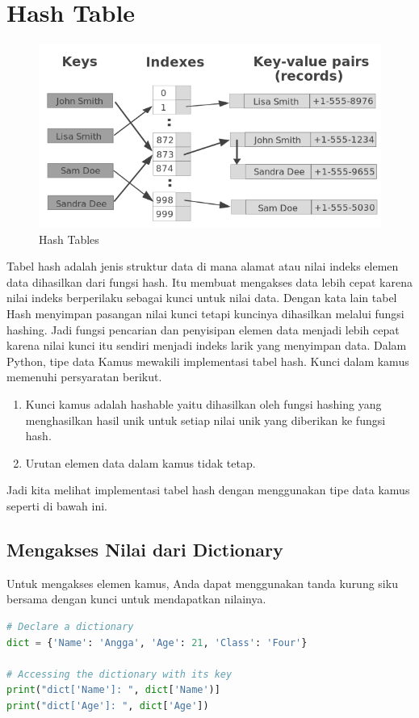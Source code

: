 \section{Hash Table}
\begin{figure}[H]
        \centerline{\includegraphics[scale=0.5]{figures/hash-tables/hash-function}}
        \caption{Hash Tables}
\end{figure}
Tabel hash adalah jenis struktur data di mana alamat atau nilai indeks elemen data dihasilkan dari fungsi hash. Itu membuat mengakses data lebih cepat karena nilai indeks berperilaku sebagai kunci untuk nilai data. Dengan kata lain tabel Hash menyimpan pasangan nilai kunci tetapi kuncinya dihasilkan melalui fungsi hashing. Jadi fungsi pencarian dan penyisipan elemen data menjadi lebih cepat karena nilai kunci itu sendiri menjadi indeks larik yang menyimpan data. Dalam Python, tipe data Kamus mewakili implementasi tabel hash. Kunci dalam kamus memenuhi persyaratan berikut.

\begin{enumerate}
\item Kunci kamus adalah hashable yaitu dihasilkan oleh fungsi hashing yang menghasilkan hasil unik untuk setiap nilai unik yang diberikan ke fungsi hash.
\item Urutan elemen data dalam kamus tidak tetap.
\end{enumerate}

Jadi kita melihat implementasi tabel hash dengan menggunakan tipe data kamus seperti di bawah ini.

\subsection{Mengakses Nilai dari Dictionary}
Untuk mengakses elemen kamus, Anda dapat menggunakan tanda kurung siku bersama dengan kunci untuk mendapatkan nilainya.
\begin{lstlisting}[language=Python, caption=Implementasi Hash Table]
# Declare a dictionary 
dict = {'Name': 'Angga', 'Age': 21, 'Class': 'Four'}

# Accessing the dictionary with its key
print("dict['Name']: ", dict['Name')]
print("dict['Age']: ", dict['Age'])
\end{lstlisting}

